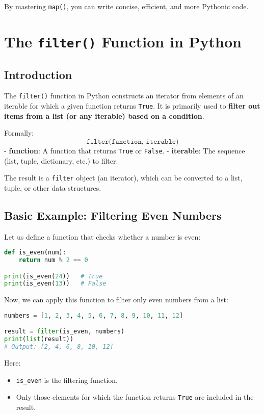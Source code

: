 By mastering \texttt{map()}, you can write concise, efficient, and more Pythonic code.


\chapter{The \texttt{filter()} Function in Python}

\section{Introduction}
The \texttt{filter()} function in Python constructs an iterator from elements of an iterable for which a given function returns \texttt{True}.  
It is primarily used to \textbf{filter out items from a list (or any iterable) based on a condition}.  

Formally:
\[
\texttt{filter(function, iterable)}
\]
- \textbf{function}: A function that returns \texttt{True} or \texttt{False}.  
- \textbf{iterable}: The sequence (list, tuple, dictionary, etc.) to filter.  

The result is a \texttt{filter} object (an iterator), which can be converted to a list, tuple, or other data structures.

\section{Basic Example: Filtering Even Numbers}
Let us define a function that checks whether a number is even:

\begin{lstlisting}[language=Python, caption={Checking even numbers}]
def is_even(num):
    return num % 2 == 0

print(is_even(24))   # True
print(is_even(13))   # False
\end{lstlisting}

Now, we can apply this function to filter only even numbers from a list:

\begin{lstlisting}[language=Python, caption={Filtering even numbers from a list}]
numbers = [1, 2, 3, 4, 5, 6, 7, 8, 9, 10, 11, 12]

result = filter(is_even, numbers)
print(list(result))
# Output: [2, 4, 6, 8, 10, 12]
\end{lstlisting}

Here:
\begin{itemize}
    \item \texttt{is\_even} is the filtering function.
    \item Only those elements for which the function returns \texttt{True} are included in the result.
\end{itemize}

